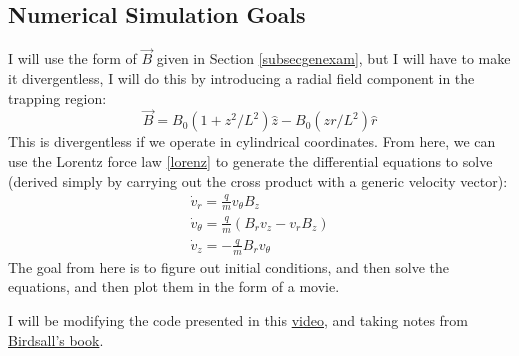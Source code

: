 \documentclass[12pt]{article}
\begin{document}
\subsection{Numerical Simulation Goals}\label{numergoals}
I will use the form of $\vec{B}$ given in Section \ref{subsecgenexam}, but I will have to make it divergentless, I will do this by introducing a radial field component in the trapping region:
\begin{equation}\label{magmirfield}
\vec{B}=B_0(1+z^2/L^2)\hat{z}-B_0(zr/L^2)\hat{r}
\end{equation}
This is divergentless if we operate in cylindrical coordinates. From here, we can use the Lorentz force law \eqref{lorenz} to generate the differential equations to solve (derived simply by carrying out the cross product with a generic velocity vector):
\begin{equation}\label{magmirDEs}
\begin{split}
\dot{v}_r=\frac{q}{m}v_{\theta}B_z\\
\dot{v}_{\theta}=\frac{q}{m}(B_rv_z-v_rB_z)\\
\dot{v}_z=-\frac{q}{m}B_rv_{\theta}
\end{split}
\end{equation}
The goal from here is to figure out initial conditions, and then solve the equations, and then plot them in the form of a movie.

I will be modifying the code presented in this \href{https://www.youtube.com/watch?v=d4NlmGkfagk&t=889s&ab_channel=PyPhy}{video}, and taking notes from \href{http://www.amazon.com/gp/product/0750310251/ref=as_li_ss_tl?ie=UTF8&tag=slovcook-20&linkCode=as2&camp=217145}{Birdsall's book}. 
\end{document}
